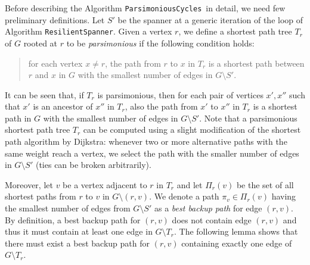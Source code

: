 \documentclass{article}
\newcommand{\commento}[1] {}
\newcommand{\ResilientSpanner}{\texttt{ResilientSpanner}}
\newcommand{\ParsimoniousCycles}{\texttt{ParsimoniousCycles}}
\begin{document}
Before describing the Algorithm \ParsimoniousCycles\ in detail, we need few preliminary definitions. 
Let $S'$ be the spanner at a generic iteration of the loop of Algorithm \ResilientSpanner. Given a vertex $r$, we define a shortest path tree $T_r$ of $G$ rooted at $r$ to be \emph{parsimonious} if the following condition holds:
\begin{quote}
for each vertex $x\not= r$, the path from $r$ to $x$ in $T_r$ is a shortest path 
between $r$ and $x$ in $G$ with the smallest number of edges in $G\setminus S'$.
\end{quote}
It can be seen that, if $T_r$ is parsimonious, then for each pair of vertices $x',x''$ such that $x'$ is an ancestor of $x''$ in $T_r$, also the path from $x'$ to $x''$ in $T_r$ is a shortest path in $G$ with the smallest number of edges in $G\setminus S'$.
Note that a parsimonious shortest path tree $T_r$ can be computed using a slight modification of the shortest path algorithm by Dijkstra: whenever two or more alternative paths with the same weight reach a vertex, we select the path with the smaller number of edges in $G \setminus S'$ (ties can be broken arbitrarily).
\commento{
For each vertex $x \not= r$ we define:
\begin{itemize}
\item $\delta_r(x)$: the distance from $r$ to $x$;
\item $\tau_r(x)$: the vertex such that $(r, \tau_r(x))$ is the first edge in the shortest path from $r$ to $x$ in $T_r$;
\item $p_{\delta,r}(x)$: the vertex preceding $x$ in the shortest path from $r$ to $x$ in $T_r$;
\item $k_{\delta,r}(x)$: the number of edges from $G\setminus R$ in the shortest path in $T_r$ from $r$ to $x$.
\end{itemize} 
Moreover, given a vertex $v$ adjacent to $r$, let $t_r(v)$ be the subtree of $T_r$ rooted at $v$.
Let $x$ be a vertex in $t_r(v)$, and let $\pi_x$ be a shortest path from $r$ to $x$ in $G\setminus (r,v)$.
We say that $\pi_x$ is a \emph{best backup path} for $x$ if it contains the smallest number of edges from $G \setminus R$.
}
Moreover, let $v$ be a vertex adjacent to $r$ in $T_r$ and let  $\Pi_r(v)$ be the set of all shortest paths from $r$ to $v$ in $G\setminus (r,v)$.
We denote a 
path $\pi_v \in \Pi_r(v)$ having the smallest number of edges from $G \setminus S'$ as a \emph{best backup path} for edge $(r,v)$.
By definition, a best backup path for $(r,v)$ does not contain edge $(r,v)$ and thus it must contain at least one edge in $G\setminus T_r$. 
The following lemma shows that there must exist a best backup path for $(r,v)$ containing exactly one edge of $G\setminus T_r$. 
\end{document}
